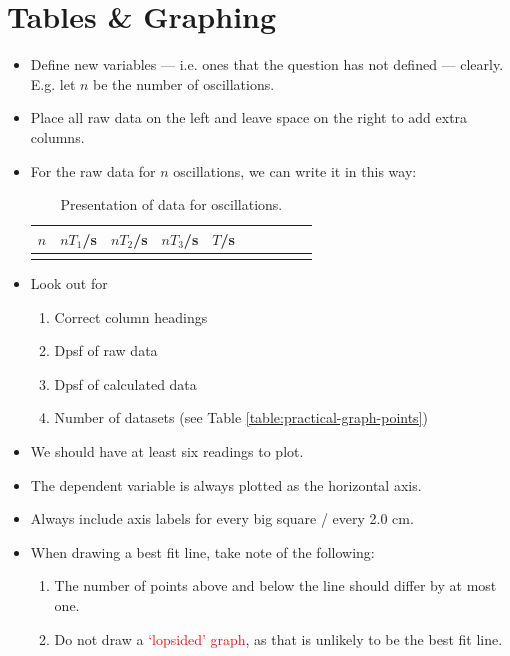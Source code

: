 \documentclass[oneside]{book}
\begin{document}
\section{Tables \& Graphing}
\begin{itemize}
    \item Define new variables --- i.e. ones that the question has not defined --- clearly. E.g. let \(n\) be the number of oscillations.
    \item Place all raw data on the left and leave space on the right to add extra columns.
    \item For the raw data for \(n\) oscillations, we can write it in this way:
    \begin{table}[H]
        \centering
        \begin{tabular}{|Sc|Sc|Sc|Sc|Sc|}
            \hline
            \(n\) & \(nT_1\)/s & \(nT_2\)/s & \(nT_3\)/s & \(T\)/s\\
            \hline
            &&&&\\
            \hline
        \end{tabular}
        \caption{Presentation of data for oscillations.}
        \label{table:raw-data-for-n-oscillations}
    \end{table} 
    \item Look out for
    \begin{enumerate}
        \item Correct column headings
        \item Dpsf of raw data
        \item Dpsf of calculated data
        \item Number of datasets (see Table \ref{table:practical-graph-points})
    \end{enumerate}
    \item We should have at least six readings to plot.
    \item The dependent variable is always plotted as the horizontal axis.
    \item Always include axis labels for every big square / every 2.0 cm.
    \item When drawing a best fit line, take note of the following:
    \begin{enumerate}
        \item The number of points above and below the line should differ by at most one.
        \item Do not draw a \textcolor{red}{`lopsided' graph}, as that is unlikely to be the \textcolor{green!70!black}{best fit line}.

\end{enumerate}
\end{itemize}
\end{document}
